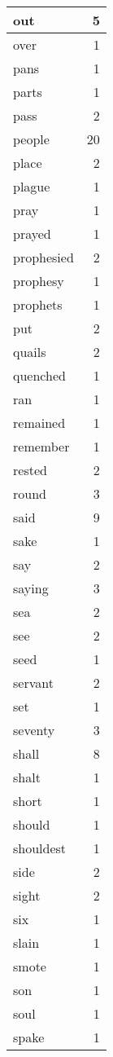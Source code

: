 \begin{center}
\begin{longtable}{l|r}
out & 5 \\ \hline
over & 1 \\ \hline
pans & 1 \\ \hline
parts & 1 \\ \hline
pass & 2 \\ \hline
people & 20 \\ \hline
place & 2 \\ \hline
plague & 1 \\ \hline
pray & 1 \\ \hline
prayed & 1 \\ \hline
prophesied & 2 \\ \hline
prophesy & 1 \\ \hline
prophets & 1 \\ \hline
put & 2 \\ \hline
quails & 2 \\ \hline
quenched & 1 \\ \hline
ran & 1 \\ \hline
remained & 1 \\ \hline
remember & 1 \\ \hline
rested & 2 \\ \hline
round & 3 \\ \hline
said & 9 \\ \hline
sake & 1 \\ \hline
say & 2 \\ \hline
saying & 3 \\ \hline
sea & 2 \\ \hline
see & 2 \\ \hline
seed & 1 \\ \hline
servant & 2 \\ \hline
set & 1 \\ \hline
seventy & 3 \\ \hline
shall & 8 \\ \hline
shalt & 1 \\ \hline
short & 1 \\ \hline
should & 1 \\ \hline
shouldest & 1 \\ \hline
side & 2 \\ \hline
sight & 2 \\ \hline
six & 1 \\ \hline
slain & 1 \\ \hline
smote & 1 \\ \hline
son & 1 \\ \hline
soul & 1 \\ \hline
spake & 1 \\ \hline

\end{longtable}
\end{center}
